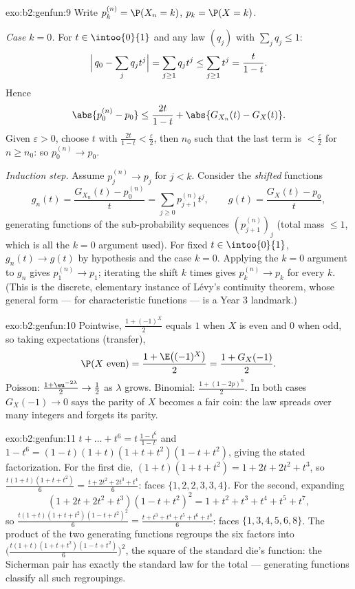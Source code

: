 \begin{solution}{exo:b2:genfun:9}
Write $p_k^{(n)} = \P(X_n = k)$, $p_k = \P(X = k)$.

\emph{Case $k = 0$.} For $t \in \intoo{0}{1}$ and any law
$(q_j)$ with $\sum_j q_j \leq 1$:
\[
\Bigl|\,q_0 - \sum_j q_jt^j\Bigr|
= \sum_{j \geq 1} q_j t^j
\leq \sum_{j\geq1}t^j = \frac{t}{1 - t} .
\]
Hence
\[
\abs{p_0^{(n)} - p_0}
\leq \frac{2t}{1 - t}
+ \abs{G_{X_n}(t) - G_X(t)} .
\]
Given $\varepsilon > 0$, choose $t$ with $\frac{2t}{1-t} <
\frac\varepsilon2$, then $n_0$ such that the last term is $<
\frac\varepsilon2$ for $n \geq n_0$: so $p_0^{(n)} \to p_0$.

\emph{Induction step.} Assume $p_j^{(n)} \to p_j$ for $j < k$.
Consider the \emph{shifted} functions
\[
g_n(t) = \frac{G_{X_n}(t) - p^{(n)}_0}{t}
= \sum_{j\geq0} p^{(n)}_{j+1}t^j,
\qquad
g(t) = \frac{G_X(t) - p_0}{t} ,
\]
generating functions of the sub-probability sequences
$(p^{(n)}_{j+1})_j$ (total mass $\leq 1$, which is all the
$k = 0$ argument used). For fixed $t \in \intoo{0}{1}$, $g_n(t)
\to g(t)$ by hypothesis and the case $k = 0$. Applying the $k =
0$ argument to $g_n$ gives $p_1^{(n)} \to p_1$; iterating the
shift $k$ times gives $p_k^{(n)} \to p_k$ for every $k$. (This is
the discrete, elementary instance of Lévy's continuity theorem,
whose general form --- for characteristic functions --- is a Year
3 landmark.)
\end{solution}

\begin{solution}{exo:b2:genfun:10}
Pointwise, $\frac{1 + (-1)^X}{2}$ equals $1$ when $X$ is even
and $0$ when odd, so taking expectations (transfer),
\[
\P(X \text{ even}) = \frac{1 + \E\bigl((-1)^X\bigr)}2 =
\frac{1 + G_X(-1)}2 .
\]
Poisson: $\frac{1 + \eu^{-2\lambda}}2 \to \frac12$ as
$\lambda$ grows. Binomial: $\frac{1 + (1 - 2p)^n}2$. In both
cases $G_X(-1) \to 0$ says the parity of $X$ becomes a fair
coin: the law spreads over many integers and forgets its
parity.
\end{solution}

\begin{solution}{exo:b2:genfun:11}
$t + \dots + t^6 = t\,\frac{1 - t^6}{1 - t}$ and $1 - t^6 =
(1 - t)(1 + t)(1 + t + t^2)(1 - t + t^2)$, giving the stated
factorization. For the first die, $(1 + t)(1 + t + t^2) = 1 +
2t + 2t^2 + t^3$, so $\frac{t(1+t)(1+t+t^2)}6 = \frac{t +
2t^2 + 2t^3 + t^4}6$: faces $\{1, 2, 2, 3, 3, 4\}$. For the
second, expanding
\[
(1 + 2t + 2t^2 + t^3)(1 - t + t^2)^2 = 1 + t^2 + t^3 + t^4 +
t^5 + t^7,
\]
so $\frac{t(1+t)(1+t+t^2)(1-t+t^2)^2}6 = \frac{t + t^3 + t^4
+ t^5 + t^6 + t^8}6$: faces $\{1, 3, 4, 5, 6, 8\}$. The
product of the two generating functions regroups the six
factors into $\bigl(\frac{t(1+t)(1+t+t^2)(1-t+t^2)}6
\bigr)^2$, the square of the standard die's function: the
Sicherman pair has exactly the standard law for the total ---
generating functions classify all such regroupings.
\end{solution}

